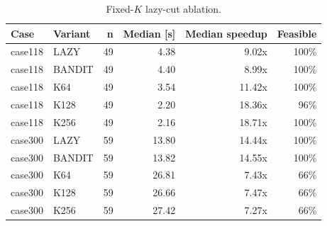\begin{table}[t]\centering
\caption{Fixed-$K$ lazy-cut ablation.}
\label{tab:lazy_topk}
\small
\begin{tabular}{|l|l|r|r|r|r|}
\hline
\textbf{Case} & \textbf{Variant} & \textbf{n} & \textbf{Median [s]} & \textbf{Median speedup} & \textbf{Feasible} \\
\hline
case118 & LAZY & 49 & 4.38 & 9.02x & 100\% \\
case118 & BANDIT & 49 & 4.40 & 8.99x & 100\% \\
case118 & K64 & 49 & 3.54 & 11.42x & 100\% \\
case118 & K128 & 49 & 2.20 & 18.36x & 96\% \\
case118 & K256 & 49 & 2.16 & 18.71x & 100\% \\
case300 & LAZY & 59 & 13.80 & 14.44x & 100\% \\
case300 & BANDIT & 59 & 13.82 & 14.55x & 100\% \\
case300 & K64 & 59 & 26.81 & 7.43x & 66\% \\
case300 & K128 & 59 & 26.66 & 7.47x & 66\% \\
case300 & K256 & 59 & 27.42 & 7.27x & 66\% \\
\hline
\end{tabular}
\end{table}
